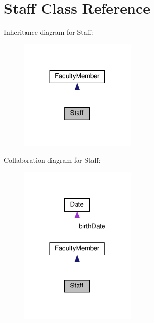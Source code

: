 \hypertarget{classStaff}{}\section{Staff Class Reference}
\label{classStaff}


Inheritance diagram for Staff\+:\nopagebreak
\begin{figure}[H]
\begin{center}
\leavevmode
\includegraphics[width=164pt]{classStaff__inherit__graph}
\end{center}
\end{figure}


Collaboration diagram for Staff\+:\nopagebreak
\begin{figure}[H]
\begin{center}
\leavevmode
\includegraphics[width=165pt]{classStaff__coll__graph}
\end{center}
\end{figure}
